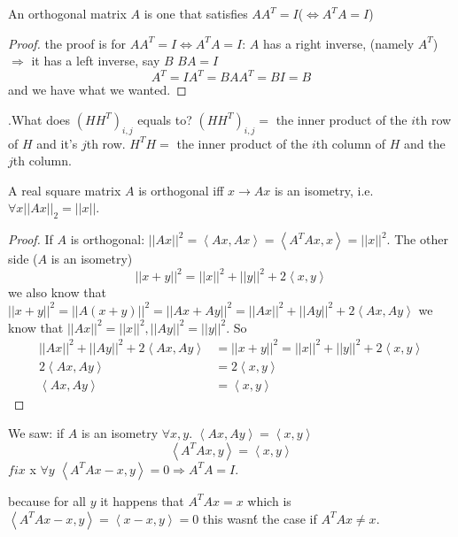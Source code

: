 \begin{claim}
An orthogonal matrix $A$ is one that satisfies $AA^{T}=I$($\iff A^{T}A=I$)
\begin{proof}
the proof is for $AA^{T}=I\iff A^{T}A=I$: $A$ has a right inverse,
(namely $A^{T}$) $\Rightarrow$ it has a left inverse, say $B$ $BA=I$
\[
A^{T}=IA^{T}=BAA^{T}=BI=B
\]
 and we have what we wanted.
\end{proof}
\end{claim}

.What does $\left(HH^{T}\right)_{i,j}$ equals to? $\left(HH^{T}\right)_{i,j}=$
the inner product of the $i$th row of $H$ and it's $j$th row. $H^{T}H=$
the inner product of the $i$th column of $H$ and the $j$th column.
\begin{proposition}
A real square matrix $A$ is orthogonal iff $x\to Ax$ is an isometry,
i.e. $\forall x\left|\left|Ax\right|\right|_{2}=\left|\left|x\right|\right|$.
\begin{proof}
If $A$ is orthogonal: $\left|\left|Ax\right|\right|^{2}=\left\langle Ax,Ax\right\rangle =\left\langle A^{T}Ax,x\right\rangle =\left|\left|x\right|\right|^{2}$.
The other side ($A$ is an isometry)
\[
\left|\left|x+y\right|\right|^{2}=\left|\left|x\right|\right|^{2}+\left|\left|y\right|\right|^{2}+2\left\langle x,y\right\rangle 
\]
 we also know that $\left|\left|x+y\right|\right|^{2}=\left|\left|A\left(x+y\right)\right|\right|^{2}=\left|\left|Ax+Ay\right|\right|^{2}=\left|\left|Ax\right|\right|^{2}+\left|\left|Ay\right|\right|^{2}+2\left\langle Ax,Ay\right\rangle $
we know that $\left|\left|Ax\right|\right|^{2}=\left|\left|x\right|\right|^{2},\left|\left|Ay\right|\right|^{2}=\left|\left|y\right|\right|^{2}$.
So 
\begin{align*}
\left|\left|Ax\right|\right|^{2}+\left|\left|Ay\right|\right|^{2}+2\left\langle Ax,Ay\right\rangle  & =\left|\left|x+y\right|\right|^{2}=\left|\left|x\right|\right|^{2}+\left|\left|y\right|\right|^{2}+2\left\langle x,y\right\rangle \\
2\left\langle Ax,Ay\right\rangle  & =2\left\langle x,y\right\rangle \\
\left\langle Ax,Ay\right\rangle  & =\left\langle x,y\right\rangle 
\end{align*}
\end{proof}
We saw: if $A$ is an isometry $\forall x,y$. $\left\langle Ax,Ay\right\rangle =\left\langle x,y\right\rangle $
\[
\left\langle A^{T}Ax,y\right\rangle =\left\langle x,y\right\rangle 
\]
$fix$ x $\forall y$ $\left\langle A^{T}Ax-x,y\right\rangle =0\Rightarrow$$A^{T}A=I$.%
\begin{insight}
because for all $y$ it happens that $A^{T}Ax=x$ which is $\left\langle A^{T}Ax-x,y\right\rangle =\left\langle x-x,y\right\rangle =0$
this wasn\'{t} the case if $A^{T}Ax\ne x$.%
\end{insight}

\end{proposition}


